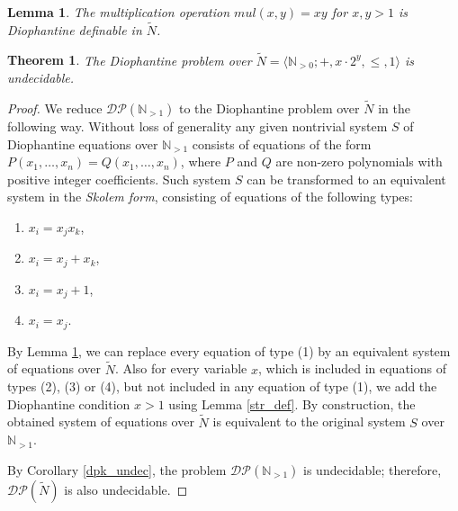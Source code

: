 \documentclass[10pt,a4paper]{amsart}
\newtheorem{lem}{Lemma}
\newtheorem{thm}{Theorem}
\begin{document}
\begin{lem} \label{mult_def}
The multiplication operation $mul(x,y) = xy$ for $x,y>1$ is Diophantine definable in $\widetilde{N}$.
\end{lem}

\begin{thm} \label{main}
The Diophantine problem over $\widetilde{N} = \langle \mathbb{N}_{>0}; +, x \cdot 2^y, \leq, 1 \rangle$ is undecidable.
\end{thm}

\begin{proof}
We reduce $\mathcal{DP}(\mathbb{N}_{>1})$ to the Diophantine problem over $\widetilde{N}$ in the following way.
Without loss of generality any given nontrivial system $S$ of Diophantine equations over $\mathbb{N}_{>1}$ 
consists of equations of the form $P(x_1, \ldots, x_n) = Q(x_1, \ldots, x_n)$,
where $P$ and $Q$ are non-zero polynomials with positive integer coefficients.
Such system $S$ can be transformed to an equivalent system in the {\it Skolem form}, consisting of equations of
the following types:
\begin{enumerate}
\item $x_i = x_j x_k$,
\item $x_i = x_j + x_k$,
\item $x_i = x_j + 1$,
\item $x_i = x_j$.
\end{enumerate}
By Lemma \ref{mult_def}, we can replace every equation of type (1) by an equivalent system of equations over $\widetilde{N}$.
Also for every variable $x$, which is included in equations of types (2), (3) or (4), but not included in any equation of type (1),
we add the Diophantine condition $x>1$ using Lemma \ref{str_def}. 
By construction, the obtained system of equations over $\widetilde{N}$ is equivalent to the original system $S$ over $\mathbb{N}_{>1}$.

By Corollary \ref{dpk_undec}, the problem $\mathcal{DP}(\mathbb{N}_{>1})$ is undecidable;
therefore, $\mathcal{DP}(\widetilde{N})$ is also undecidable.
\end{proof}
\end{document}
